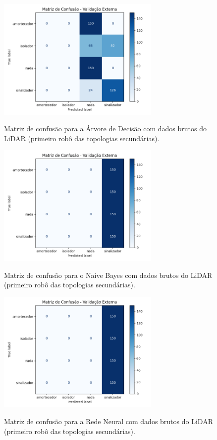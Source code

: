 \begin{figure}[H]
\centering
\caption{Matriz de confusão para a Árvore de Decisão com dados brutos do LiDAR (primeiro robô das topologias secundárias).}
\includegraphics[width=0.7\textwidth]{figuras/Resultados/multi_primeiro_Teste2_tree.png}
\label{fig:mc_lidar_tree_robo1_t2}
\fonte{}
\end{figure}

\begin{figure}[H]
\centering
\caption{Matriz de confusão para o Naive Bayes com dados brutos do LiDAR (primeiro robô das topologias secundárias).}
\includegraphics[width=0.7\textwidth]{figuras/Resultados/multi_primeiro_Teste2_naive.png}
\label{fig:mc_lidar_naive_robo1_t2}
\fonte{}
\end{figure}

\begin{figure}[H]
\centering
\caption{Matriz de confusão para a Rede Neural com dados brutos do LiDAR (primeiro robô das topologias secundárias).}
\includegraphics[width=0.7\textwidth]{figuras/Resultados/multi_primeiro_Teste2_nn.png}
\label{fig:mc_lidar_nn_robo1_t2}
\fonte{}
\end{figure}

